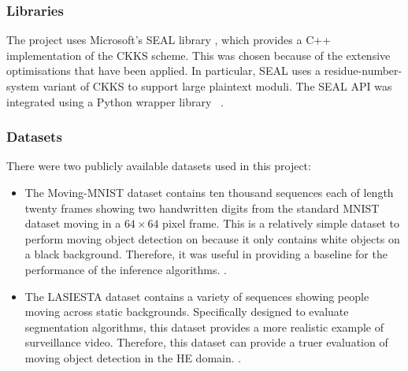\setlength{\leftskip}{0cm}
\subsubsection{Libraries}
\setlength{\leftskip}{0.5cm}
\indent \indent
The project uses Microsoft's SEAL library \cite{SEAL}, which provides a C++ implementation of the CKKS scheme. This was chosen because of the extensive optimisations that have been applied. In particular, SEAL uses a residue-number-system variant of CKKS to support large plaintext moduli. The SEAL API was integrated using a Python wrapper library ~\cite{Wrapper}.

\setlength{\leftskip}{0cm}
\subsubsection{Datasets}
\setlength{\leftskip}{0.5cm}
\indent \indent
There were two publicly available datasets used in this project:
\begin{itemize}[leftmargin=1.5cm]
    \item The Moving-MNIST dataset contains ten thousand sequences each of length twenty frames showing two handwritten digits from the standard MNIST dataset moving in a $64 \times 64$ pixel frame. This is a relatively simple dataset to perform moving object detection on because it only contains white objects on a black background. Therefore, it was useful in providing a baseline for the performance of the inference algorithms. \cite{MovingMNIST, MNIST}.
    \item The LASIESTA dataset contains a variety of sequences showing people moving across static backgrounds. Specifically designed to evaluate segmentation algorithms, this dataset provides a more realistic example of surveillance video. Therefore, this dataset can provide a truer evaluation of moving object detection in the HE domain. \cite{LASIESTA}.
\end{itemize}

\setlength{\leftskip}{0cm}
